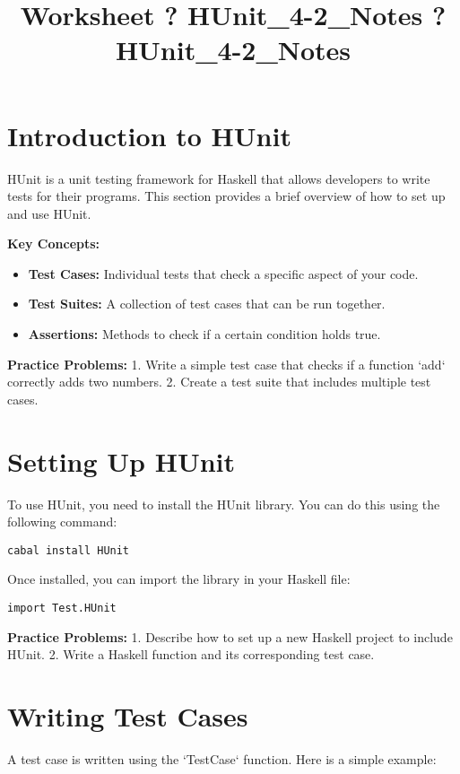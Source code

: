 \documentclass{article}
\title{Worksheet ? HUnit\_4-2\_Notes ? HUnit\_4-2\_Notes}
\author{}
\date{}
\begin{document}
\maketitle

\section*{Introduction to HUnit}
HUnit is a unit testing framework for Haskell that allows developers to write tests for their programs. This section provides a brief overview of how to set up and use HUnit.

\textbf{Key Concepts:}
\begin{itemize}
    \item \textbf{Test Cases:} Individual tests that check a specific aspect of your code.
    \item \textbf{Test Suites:} A collection of test cases that can be run together.
    \item \textbf{Assertions:} Methods to check if a certain condition holds true.
\end{itemize}

\textbf{Practice Problems:}
1. Write a simple test case that checks if a function `add` correctly adds two numbers.
2. Create a test suite that includes multiple test cases.

\section*{Setting Up HUnit}
To use HUnit, you need to install the HUnit library. You can do this using the following command:

\begin{verbatim}
cabal install HUnit
\end{verbatim}

Once installed, you can import the library in your Haskell file:

\begin{verbatim}
import Test.HUnit
\end{verbatim}

\textbf{Practice Problems:}
1. Describe how to set up a new Haskell project to include HUnit.
2. Write a Haskell function and its corresponding test case.

\section*{Writing Test Cases}
A test case is written using the `TestCase` function. Here is a simple example:
\end{document}
